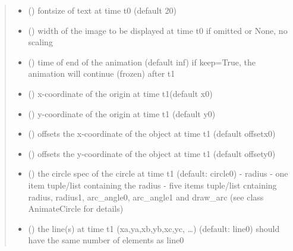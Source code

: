 \documentclass[letterpaper,10pt,english]{sphinxmanual}
\begin{document}
\begin{fulllineitems}
\begin{quote}
\begin{description}
\begin{itemize}
\item {} 
 () \textendash{} fontsize of text at time t0 (default 20)

\item {} 
 () \textendash{} width of the image to be displayed at time t0 
if omitted or None, no scaling

\item {} 
 () \textendash{} time of end of the animation (default inf) 
if keep=True, the animation will continue (frozen) after t1

\item {} 
 () \textendash{} x-coordinate of the origin at time t1(default x0)

\item {} 
 () \textendash{} y-coordinate of the origin at time t1 (default y0)

\item {} 
 () \textendash{} offsets the x-coordinate of the object at time t1 (default offsetx0)

\item {} 
 () \textendash{} offsets the y-coordinate of the object at time t1 (default offsety0)

\item {} 
 () \textendash{} the circle spec of the circle at time t1 (default: circle0) 
- radius 
- one item tuple/list containing the radius 
- five items tuple/list cntaining radius, radius1, arc\_angle0, arc\_angle1 and draw\_arc
(see class AnimateCircle for details)

\item {} 
 () \textendash{} the line(s) at time t1 (xa,ya,xb,yb,xc,yc, …) (default: line0) 
should have the same number of elements as line0


\end{itemize}
\end{description}
\end{quote}
\end{fulllineitems}
\end{document}
